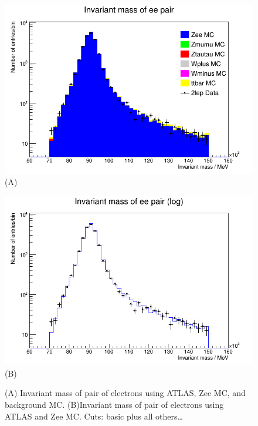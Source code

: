 \begin{figure}[h!]
    \centering
    \begin{minipage}{0.5\textwidth}
        \centering
        \includegraphics[width=\linewidth]{plots/02-03-2021/08-41_invar-mass.png}
        (A)
    \end{minipage}\hfill
    \begin{minipage}{0.5\textwidth}
        \centering
        \includegraphics[width=\linewidth]{plots/02-03-2021/08-46_2-Stack_2lep_Zee_invar-mass.png}
        (B)
    \end{minipage}
    \caption{(A) Invariant mass of pair of electrons using ATLAS, Zee MC, and background MC.  (B)Invariant mass of pair of electrons using ATLAS and Zee MC.  Cuts: basic plus all others\dots}
    \label{fig:08-41_02-02-21}
\end{figure}

